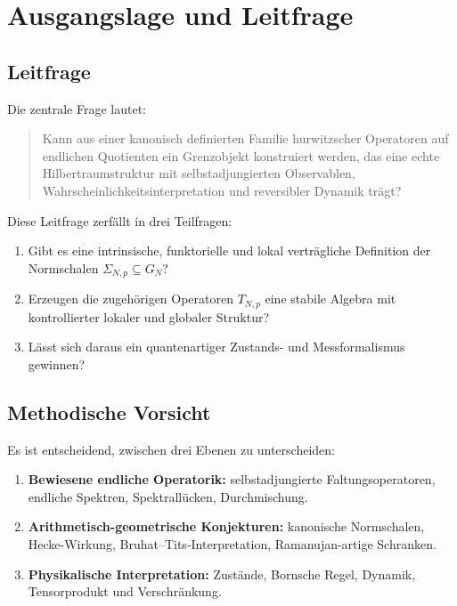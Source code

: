 \documentclass[12pt,a4paper]{article}
\theoremstyle{plain}
\theoremstyle{definition}
\theoremstyle{remark}
\begin{document}
	\section{Ausgangslage und Leitfrage}
	
	\subsection{Leitfrage}
	
	Die zentrale Frage lautet:
	
	\begin{quote}
		Kann aus einer kanonisch definierten Familie hurwitzscher Operatoren auf endlichen Quotienten
		ein Grenzobjekt konstruiert werden, das eine echte Hilbertraumstruktur mit selbstadjungierten
		Observablen, Wahrscheinlichkeitsinterpretation und reversibler Dynamik trägt?
	\end{quote}
	
	Diese Leitfrage zerfällt in drei Teilfragen:
	\begin{enumerate}
		\item Gibt es eine intrinsische, funktorielle und lokal verträgliche Definition der
		Normschalen \(\Sigma_{N,p}\subseteq G_N\)?
		\item Erzeugen die zugehörigen Operatoren \(T_{N,p}\) eine stabile Algebra mit
		kontrollierter lokaler und globaler Struktur?
		\item Lässt sich daraus ein quantenartiger Zustands- und Messformalismus gewinnen?
	\end{enumerate}
	
	\subsection{Methodische Vorsicht}
	
	Es ist entscheidend, zwischen drei Ebenen zu unterscheiden:
	\begin{enumerate}
		\item \textbf{Bewiesene endliche Operatorik:} selbstadjungierte Faltungsoperatoren,
		endliche Spektren, Spektrallücken, Durchmischung.
		\item \textbf{Arithmetisch-geometrische Konjekturen:} kanonische Normschalen, Hecke-Wirkung,
		Bruhat--Tits-Interpretation, Ramanujan-artige Schranken.
		\item \textbf{Physikalische Interpretation:} Zustände, Bornsche Regel, Dynamik,
		Tensorprodukt und Verschränkung.
	\end{enumerate}
	
\end{document}
